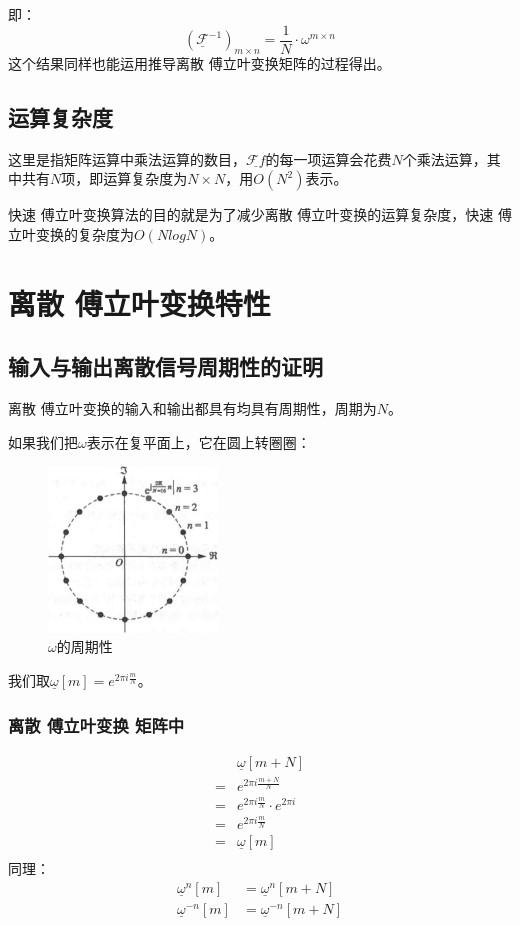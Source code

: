 即：
\begin{equation}
	\left( \underline{\mathcal{F}}^{-1} \right)_{m\times n} = \frac{1}{N}\cdot \omega^{m\times n}
\end{equation}
这个结果同样也能运用推导离散 傅立叶变换矩阵的过程得出。

\subsection{运算复杂度}
这里是指矩阵运算中乘法运算的数目，$\underline{\mathcal{F}f}$的每一项运算会花费$N$个乘法运算，其中共有$N$项，即运算复杂度为$N\times N$，用$O(N^2)$表示。

快速 傅立叶变换算法的目的就是为了减少离散 傅立叶变换的运算复杂度，快速 傅立叶变换的复杂度为$O(NlogN)$。
\section{离散 傅立叶变换特性}
\subsection{输入与输出离散信号周期性的证明}
离散 傅立叶变换的输入和输出都具有均具有周期性，周期为$N$。

如果我们把$\omega$表示在复平面上，它在圆上转圈圈：
\begin{figure}[H]
	\centering
	\includegraphics[width=0.4\textwidth]{assets/omega.png}
	\caption{$\omega$的周期性}
\end{figure}

我们取$\underline{\omega}[m] =e^{2\pi i \frac{m}{N}} $。
\subsubsection{离散 傅立叶变换 矩阵中}
\begin{align*}
	  & \underline{\omega}[m+N]               \\
	= & e^{2\pi i\frac{m+N}{N}}               \\
	= & e^{2\pi i\frac{m}{N}}\cdot e^{2\pi i} \\
	= & e^{2\pi i\frac{m}{N}}                 \\
	= & \underline{\omega}[m]                 \\
\end{align*}
同理：
\begin{align*}
	\underline{\omega}^{n}[m]  & = \underline{\omega}^n[m+N]    \\
	\underline{\omega}^{-n}[m] & = \underline{\omega}^{-n}[m+N]
\end{align*}

